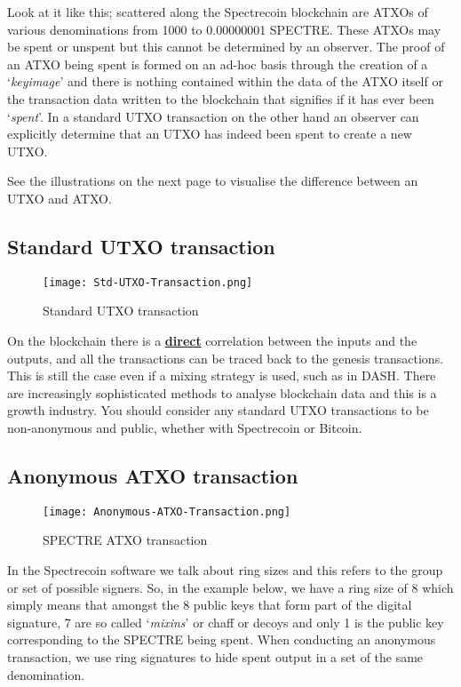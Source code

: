 Look at it like this; scattered along the Spectrecoin blockchain are ATXOs of
various denominations from 1000 to 0.00000001 SPECTRE. These ATXOs may be spent
or unspent but this cannot be determined by an observer. The proof of an ATXO
being spent is formed on an ad-hoc basis through the creation of a ‘\textit{keyimage}’
and there is nothing contained within the data of the ATXO itself or the
transaction data written to the blockchain that signifies if it has ever been
‘\textit{spent}’. In a standard UTXO transaction on the other hand an observer can
explicitly determine that an UTXO has indeed been spent to create a new UTXO.



See the illustrations on the next page to visualise the difference between an
UTXO and ATXO.



\subsection{Standard UTXO transaction}

\begin{figure}[h]
	\caption{Standard UTXO transaction}
	\centering
	\texttt{[image: Std-UTXO-Transaction.png]}
\end{figure}



On the blockchain there is a \textbf{\underline{direct}} correlation
between the inputs and the outputs, and all the transactions can be 
traced back to the genesis transactions. This is still the case even 
if a mixing strategy is used, such as in DASH. There are increasingly 
sophisticated methods to analyse blockchain data and this is a growth 
industry. You should consider any standard UTXO transactions to be 
non-anonymous and public, whether with Spectrecoin or Bitcoin.



\subsection{Anonymous ATXO transaction}



\begin{figure}[h]
	\caption{SPECTRE ATXO transaction}
	\centering
	\texttt{[image: Anonymous-ATXO-Transaction.png]}
\end{figure}



In the Spectrecoin software we talk about ring sizes and this refers to the
group or set of possible signers. So, in the example below, we have a ring
size of 8 which simply means that amongst the 8 public keys that form part
of the digital signature, 7 are so called ‘\textit{mixins}’ or chaff or decoys and
only 1 is the public key corresponding to the SPECTRE being spent. When
conducting an anonymous transaction, we use ring signatures to hide spent
output in a set of the same denomination.



